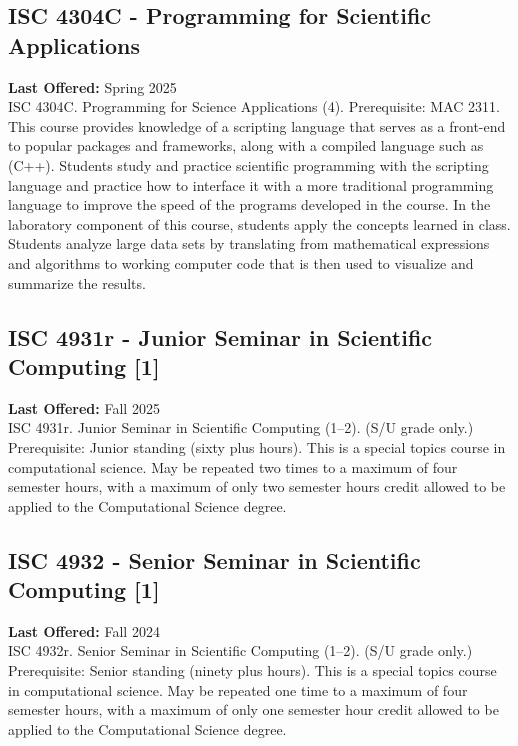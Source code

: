 \documentclass[12pt,a4paper]{article}
\begin{document}
\subsection{ISC 4304C - Programming for Scientific Applications}
\textbf{Last Offered:} Spring 2025 \\
ISC 4304C. Programming for Science Applications (4). Prerequisite: MAC 2311. This course provides knowledge of a scripting language that serves as a front-end to popular packages and frameworks, along with a compiled language such as (C++). Students study and practice scientific programming with the scripting language and practice how to interface it with a more traditional programming language to improve the speed of the programs developed in the course. In the laboratory component of this course, students apply the concepts learned in class. Students analyze large data sets by translating from mathematical expressions and algorithms to working computer code that is then used to visualize and summarize the results.

\subsection{ISC 4931r - Junior Seminar in Scientific Computing [1]}
\textbf{Last Offered:} Fall 2025 \\
ISC 4931r. Junior Seminar in Scientific Computing (1–2). (S/U grade only.) Prerequisite: Junior standing (sixty plus hours). This is a special topics course in computational science. May be repeated two times to a maximum of four semester hours, with a maximum of only two semester hours credit allowed to be applied to the Computational Science degree.

\subsection{ISC 4932 - Senior Seminar in Scientific Computing [1]}
\textbf{Last Offered:} Fall 2024 \\
ISC 4932r. Senior Seminar in Scientific Computing (1–2). (S/U grade only.) Prerequisite: Senior standing (ninety plus hours). This is a special topics course in computational science. May be repeated one time to a maximum of four semester hours, with a maximum of only one semester hour credit allowed to be applied to the Computational Science degree.
\end{document}
